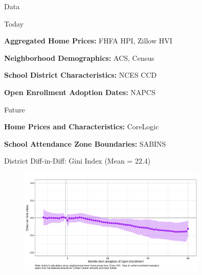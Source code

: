 \documentclass[notes,11pt, aspectratio=169]{beamer}
\newenvironment{wideitemize}{\itemize\addtolength{\itemsep}{10pt}}{\enditemize}
\begin{document}
\begin{frame}{Data}
\label{data} 
\begin{wideitemize}
\item Today
\begin{wideitemize}
\item \textbf{Aggregated Home Prices:} FHFA HPI, Zillow HVI
\item \textbf{Neighborhood Demographics:} ACS, Census
\item \textbf{School District Characteristics:} NCES CCD
\item \textbf{Open Enrollment Adoption Dates:} NAPCS
\end{wideitemize}
\item Future
\begin{wideitemize}
  \item \textbf{Home Prices and Characteristics:} CoreLogic
  \item \textbf{School Attendance Zone Boundaries:} SABINS
\end{wideitemize}
\end{wideitemize}
\hyperlink{databack}{}
\end{frame}

\begin{frame}{District Diff-in-Diff: Gini Index (Mean = 22.4)}
\label{gini_did}
\begin{figure}
\centering
\includegraphics[width=0.8\textwidth]{figures/event_study_gini.png}
\end{figure}
\hyperlink{sd}{}
\end{frame}
\end{document}
